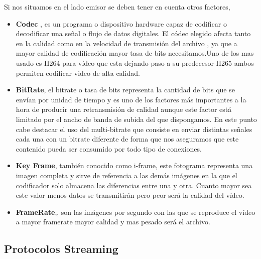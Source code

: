 Si nos situamos en el lado emisor se deben tener en cuenta otros factores,

\begin{itemize}
    \item \textbf{Codec} , es un programa o dispositivo hardware capaz de codificar o decodificar una señal o flujo de datos digitales. El códec elegido afecta tanto en la calidad como en la velocidad de transmisión del archivo , ya que a mayor calidad de codificación mayor tasa de bits necesitamos.Uno de los mas usado es H264 para vídeo que esta dejando paso a su predecesor H265 ambos permiten codificar video de alta calidad.
    
    \item \textbf{BitRate}, el bitrate o tasa de bits representa la cantidad de bits que se envían por unidad de tiempo y es uno de los factores más importantes a la hora de producir una retransmisión de calidad aunque este factor está limitado por el ancho de banda de subida del que dispongamos. En este punto cabe destacar el uso del multi-bitrate que consiste en enviar distintas señales cada una con un bitrate diferente de forma que nos aseguramos que este contenido pueda ser consumido por todo tipo de conexiones. 
     
    \item \textbf{Key Frame}, también conocido como i-frame, este fotograma representa una imagen completa y sirve de referencia a las demás imágenes en la que el codificador solo almacena las diferencias entre una y otra. Cuanto mayor sea este valor menos datos se transmitirán pero peor será la calidad del vídeo. 
      
    \item \textbf{FrameRate},, son las imágenes por segundo con las que se reproduce el vídeo a mayor framerate mayor calidad y mas pesado será el archivo. 
    
\end{itemize}

\subsection{Protocolos Streaming}

